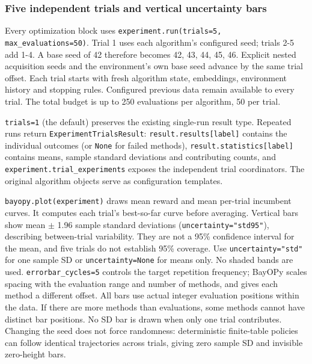 \documentclass[10pt,a4paper]{article}
\begin{document}
\subsubsection*{Five independent trials and vertical uncertainty bars}

Every optimization block uses \texttt{experiment.\allowbreak{}run(trials=\allowbreak{}5,\allowbreak{} max\_\allowbreak{}evaluations=\allowbreak{}50)}. Trial 1 uses each algorithm's configured seed; trials 2-5 add 1-4. A base seed of 42 therefore becomes 42,\allowbreak{} 43,\allowbreak{} 44,\allowbreak{} 45,\allowbreak{} 46. Explicit nested acquisition seeds and the environment's own base seed advance by the same trial offset. Each trial starts with fresh algorithm state,\allowbreak{} embeddings,\allowbreak{} environment history and stopping rules. Configured previous data remain available to every trial. The total budget is up to 250 evaluations per algorithm,\allowbreak{} 50 per trial.


\texttt{trials=\allowbreak{}1} (the default) preserves the existing single-run result type. Repeated runs return \texttt{Experiment\allowbreak{}Trials\allowbreak{}Result}: \texttt{result.\allowbreak{}results[label]} contains the individual outcomes (or \texttt{None} for failed methods),\allowbreak{} \texttt{result.\allowbreak{}statistics[label]} contains means,\allowbreak{} sample standard deviations and contributing counts,\allowbreak{} and \texttt{experiment.\allowbreak{}trial\_\allowbreak{}experiments} exposes the independent trial coordinators. The original algorithm objects serve as configuration templates.


\texttt{bayopy.\allowbreak{}plot(experiment)} draws mean reward and mean per-trial incumbent curves. It computes each trial's best-so-far curve before averaging. Vertical bars show mean \ensuremath{\pm} 1.96 sample standard deviations (\texttt{uncertainty=\allowbreak{}"std95"}),\allowbreak{} describing between-trial variability. They are not a 95\% confidence interval for the mean,\allowbreak{} and five trials do not establish 95\% coverage. Use \texttt{uncertainty=\allowbreak{}"std"} for one sample SD or \texttt{uncertainty=\allowbreak{}None} for means only. No shaded bands are used. \texttt{errorbar\_\allowbreak{}cycles=\allowbreak{}5} controls the target repetition frequency; BayOPy scales spacing with the evaluation range and number of methods,\allowbreak{} and gives each method a different offset. All bars use actual integer evaluation positions within the data. If there are more methods than evaluations,\allowbreak{} some methods cannot have distinct bar positions. No SD bar is drawn when only one trial contributes. Changing the seed does not force randomness: deterministic finite-table policies can follow identical trajectories across trials,\allowbreak{} giving zero sample SD and invisible zero-height bars.
\end{document}
